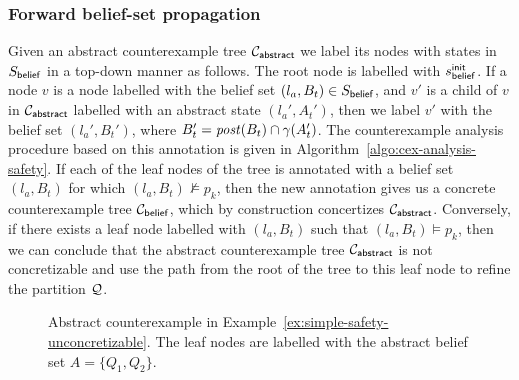 \subsubsection{Forward belief-set propagation}
Given an abstract counterexample tree $\mathcal{C}_{\mathsf{abstract}}$ we label its nodes with states in $S_{\mathsf{belief}}$ in a top-down manner as follows. 
The root node is labelled with $s_{\mathsf{belief}}^{\mathsf{init}}$. If a node $v$ is a node labelled with the belief set $(l_a,B_t) \in S_{\mathsf{belief}}$, and  $v'$ is a child of $v$ in $\mathcal{C}_{\mathsf{abstract}}$ labelled with an abstract state $(l_a',A_t')$, then we label $v'$ with the belief set $(l_a',B_t')$, where 
$B_t' = \mathit{post}(B_t) \cap \gamma(A_t')$. The counterexample analysis procedure based on this annotation is given in Algorithm~\ref{algo:cex-analysis-safety}.
If each of the leaf nodes of the tree is annotated with a belief set $(l_a,B_t)$ for which $(l_a,B_t) \not\models p_k$, then the new annotation gives us a concrete counterexample tree $\mathcal{C}_{\mathsf{belief}}$, which by construction concertizes $\mathcal{C}_{\mathsf{abstract}}$. Conversely, if there exists a leaf node labelled with $(l_a,B_t)$ such that $(l_a,B_t) \models p_k$, then we can conclude that the abstract counterexample tree $\mathcal{C}_{\mathsf{abstract}}$ is not concretizable and use the path from the root of the tree to this leaf node to refine the partition $\mathcal{Q}$.

\begin{theorem}
\end{theorem}

\begin{figure}
\begin{center}

\end{center}
\caption{Abstract counterexample in Example~\ref{ex:simple-safety-unconcretizable}. The leaf nodes are labelled with the abstract belief set $A = \{Q_1,Q_2\}$.}
\label{fig:simple-safety-counterex-1}
\end{figure}

